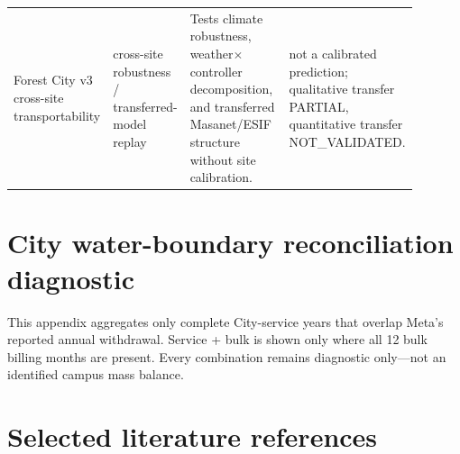 \documentclass[11pt]{article}
\newcommand{\latesttxt}[1]{\textcolor{purple!85!black}{#1}}
\begin{document}
\begin{longtable}{@{}p{0.20\linewidth}p{0.17\linewidth}p{0.30\linewidth}p{0.22\linewidth}@{}}
\latesttxt{Forest City v3 cross-site transportability} & \latesttxt{cross-site robustness / transferred-model replay} & \latesttxt{Tests climate robustness, weather$\times$controller decomposition, and transferred Masanet/ESIF structure without site calibration.} & \latesttxt{not a calibrated prediction; qualitative transfer PARTIAL, quantitative transfer NOT\_VALIDATED.}\\
\end{longtable}
\endgroup
\fi

{\color{purple!85!black}


}

\section{City water-boundary reconciliation diagnostic}

\latesttxt{This appendix aggregates only complete City-service years that overlap Meta's reported annual withdrawal. Service + bulk is shown only where all 12 bulk billing months are present. Every combination remains diagnostic only---not an identified campus mass balance.}

{\color{purple!85!black}

}

\section{Selected literature references}

\end{document}
